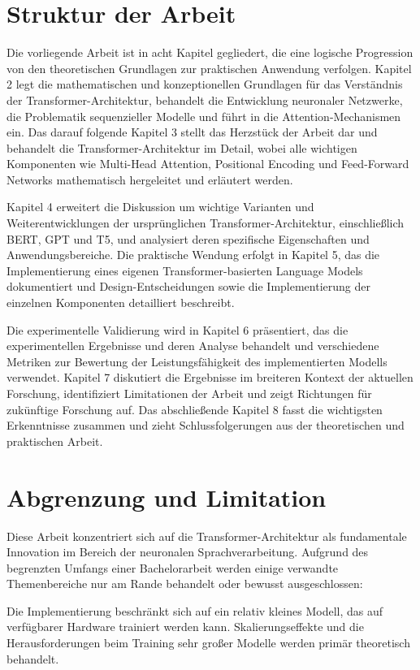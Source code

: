 \section{Struktur der Arbeit}

Die vorliegende Arbeit ist in acht Kapitel gegliedert, die eine logische Progression von den theoretischen Grundlagen zur praktischen Anwendung verfolgen. Kapitel 2 legt die mathematischen und konzeptionellen Grundlagen für das Verständnis der Transformer-Architektur, behandelt die Entwicklung neuronaler Netzwerke, die Problematik sequenzieller Modelle und führt in die Attention-Mechanismen ein. Das darauf folgende Kapitel 3 stellt das Herzstück der Arbeit dar und behandelt die Transformer-Architektur im Detail, wobei alle wichtigen Komponenten wie Multi-Head Attention, Positional Encoding und Feed-Forward Networks mathematisch hergeleitet und erläutert werden.

Kapitel 4 erweitert die Diskussion um wichtige Varianten und Weiterentwicklungen der ursprünglichen Transformer-Architektur, einschließlich BERT, GPT und T5, und analysiert deren spezifische Eigenschaften und Anwendungsbereiche. Die praktische Wendung erfolgt in Kapitel 5, das die Implementierung eines eigenen Transformer-basierten Language Models dokumentiert und Design-Entscheidungen sowie die Implementierung der einzelnen Komponenten detailliert beschreibt.

Die experimentelle Validierung wird in Kapitel 6 präsentiert, das die experimentellen Ergebnisse und deren Analyse behandelt und verschiedene Metriken zur Bewertung der Leistungsfähigkeit des implementierten Modells verwendet. Kapitel 7 diskutiert die Ergebnisse im breiteren Kontext der aktuellen Forschung, identifiziert Limitationen der Arbeit und zeigt Richtungen für zukünftige Forschung auf. Das abschließende Kapitel 8 fasst die wichtigsten Erkenntnisse zusammen und zieht Schlussfolgerungen aus der theoretischen und praktischen Arbeit.

\section{Abgrenzung und Limitation}

Diese Arbeit konzentriert sich auf die Transformer-Architektur als fundamentale Innovation im Bereich der neuronalen Sprachverarbeitung. Aufgrund des begrenzten Umfangs einer Bachelorarbeit werden einige verwandte Themenbereiche nur am Rande behandelt oder bewusst ausgeschlossen:

Die Implementierung beschränkt sich auf ein relativ kleines Modell, das auf verfügbarer Hardware trainiert werden kann. Skalierungseffekte und die Herausforderungen beim Training sehr großer Modelle werden primär theoretisch behandelt.

